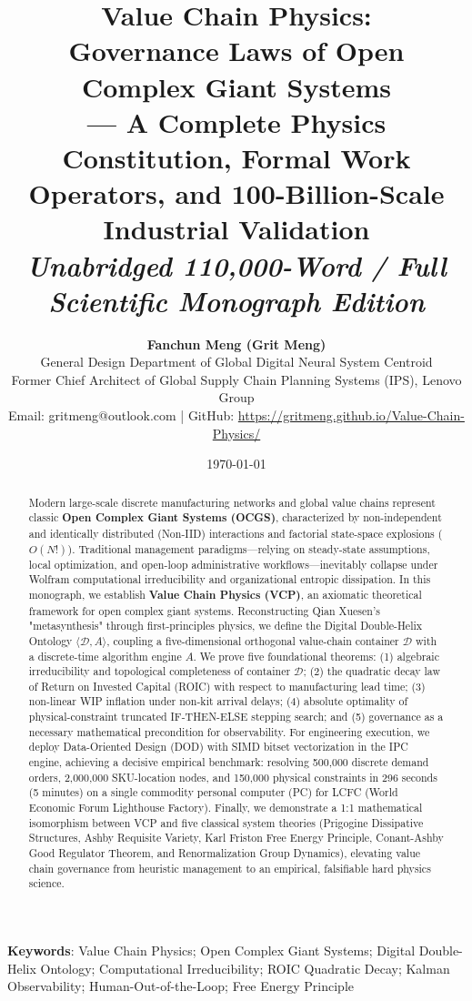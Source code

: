 \documentclass[11pt,a4paper]{article}
\title{\textbf{\Huge Value Chain Physics:}\\ \Large Governance Laws of Open Complex Giant Systems\\[0.8em]
\large --- A Complete Physics Constitution, Formal Work Operators, and 100-Billion-Scale Industrial Validation\\[0.5em]
\small \textit{Unabridged 110,000-Word / Full Scientific Monograph Edition}}
\author{\textbf{\Large Fanchun Meng (Grit Meng)}\\
\small General Design Department of Global Digital Neural System Centroid\\
\small Former Chief Architect of Global Supply Chain Planning Systems (IPS), Lenovo Group\\
\small Email: gritmeng@outlook.com | GitHub: \url{https://gritmeng.github.io/Value-Chain-Physics/}}
\date{\today}
\begin{document}
\maketitle

\begin{abstract}
Modern large-scale discrete manufacturing networks and global value chains represent classic \textbf{Open Complex Giant Systems (OCGS)}, characterized by non-independent and identically distributed (Non-IID) interactions and factorial state-space explosions ($O(N!)$). Traditional management paradigms---relying on steady-state assumptions, local optimization, and open-loop administrative workflows---inevitably collapse under Wolfram computational irreducibility and organizational entropic dissipation. In this monograph, we establish \textbf{Value Chain Physics (VCP)}, an axiomatic theoretical framework for open complex giant systems. Reconstructing Qian Xuesen's "metasynthesis" through first-principles physics, we define the Digital Double-Helix Ontology $\langle \mathcal{D}, A \rangle$, coupling a five-dimensional orthogonal value-chain container $\mathcal{D}$ with a discrete-time algorithm engine $A$. We prove five foundational theorems: (1) algebraic irreducibility and topological completeness of container $\mathcal{D}$; (2) the quadratic decay law of Return on Invested Capital (ROIC) with respect to manufacturing lead time; (3) non-linear WIP inflation under non-kit arrival delays; (4) absolute optimality of physical-constraint truncated IF-THEN-ELSE stepping search; and (5) governance as a necessary mathematical precondition for observability. For engineering execution, we deploy Data-Oriented Design (DOD) with SIMD bitset vectorization in the IPC engine, achieving a decisive empirical benchmark: resolving 500,000 discrete demand orders, 2,000,000 SKU-location nodes, and 150,000 physical constraints in 296 seconds (5 minutes) on a single commodity personal computer (PC) for LCFC (World Economic Forum Lighthouse Factory). Finally, we demonstrate a 1:1 mathematical isomorphism between VCP and five classical system theories (Prigogine Dissipative Structures, Ashby Requisite Variety, Karl Friston Free Energy Principle, Conant-Ashby Good Regulator Theorem, and Renormalization Group Dynamics), elevating value chain governance from heuristic management to an empirical, falsifiable hard physics science.
\end{abstract}

\textbf{Keywords}: Value Chain Physics; Open Complex Giant Systems; Digital Double-Helix Ontology; Computational Irreducibility; ROIC Quadratic Decay; Kalman Observability; Human-Out-of-the-Loop; Free Energy Principle
\end{document}
